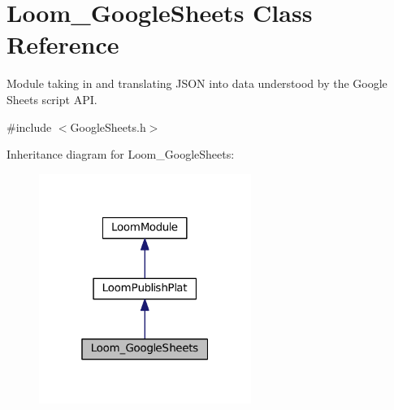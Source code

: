 \hypertarget{class_loom___google_sheets}{}\section{Loom\+\_\+\+Google\+Sheets Class Reference}
\label{class_loom___google_sheets}


Module taking in and translating J\+S\+ON into data understood by the Google Sheets script A\+PI.  




{\ttfamily \#include $<$Google\+Sheets.\+h$>$}



Inheritance diagram for Loom\+\_\+\+Google\+Sheets\+:\nopagebreak
\begin{figure}[H]
\begin{center}
\leavevmode
\includegraphics[width=196pt]{class_loom___google_sheets__inherit__graph}
\end{center}
\end{figure}
